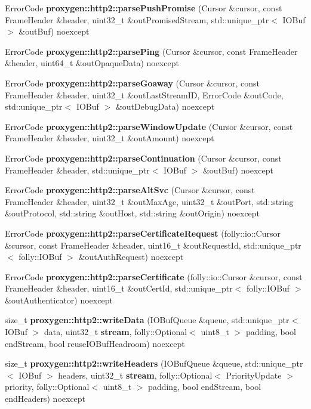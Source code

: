 \begin{DoxyCompactItemize}
\item 
Error\+Code {\bf proxygen\+::http2\+::parse\+Push\+Promise} (Cursor \&cursor, const Frame\+Header \&header, uint32\+\_\+t \&out\+Promised\+Stream, std\+::unique\+\_\+ptr$<$ I\+O\+Buf $>$ \&out\+Buf) noexcept
\item 
Error\+Code {\bf proxygen\+::http2\+::parse\+Ping} (Cursor \&cursor, const Frame\+Header \&header, uint64\+\_\+t \&out\+Opaque\+Data) noexcept
\item 
Error\+Code {\bf proxygen\+::http2\+::parse\+Goaway} (Cursor \&cursor, const Frame\+Header \&header, uint32\+\_\+t \&out\+Last\+Stream\+ID, Error\+Code \&out\+Code, std\+::unique\+\_\+ptr$<$ I\+O\+Buf $>$ \&out\+Debug\+Data) noexcept
\item 
Error\+Code {\bf proxygen\+::http2\+::parse\+Window\+Update} (Cursor \&cursor, const Frame\+Header \&header, uint32\+\_\+t \&out\+Amount) noexcept
\item 
Error\+Code {\bf proxygen\+::http2\+::parse\+Continuation} (Cursor \&cursor, const Frame\+Header \&header, std\+::unique\+\_\+ptr$<$ I\+O\+Buf $>$ \&out\+Buf) noexcept
\item 
Error\+Code {\bf proxygen\+::http2\+::parse\+Alt\+Svc} (Cursor \&cursor, const Frame\+Header \&header, uint32\+\_\+t \&out\+Max\+Age, uint32\+\_\+t \&out\+Port, std\+::string \&out\+Protocol, std\+::string \&out\+Host, std\+::string \&out\+Origin) noexcept
\item 
Error\+Code {\bf proxygen\+::http2\+::parse\+Certificate\+Request} (folly\+::io\+::\+Cursor \&cursor, const Frame\+Header \&header, uint16\+\_\+t \&out\+Request\+Id, std\+::unique\+\_\+ptr$<$ folly\+::\+I\+O\+Buf $>$ \&out\+Auth\+Request) noexcept
\item 
Error\+Code {\bf proxygen\+::http2\+::parse\+Certificate} (folly\+::io\+::\+Cursor \&cursor, const Frame\+Header \&header, uint16\+\_\+t \&out\+Cert\+Id, std\+::unique\+\_\+ptr$<$ folly\+::\+I\+O\+Buf $>$ \&out\+Authenticator) noexcept
\item 
size\+\_\+t {\bf proxygen\+::http2\+::write\+Data} (I\+O\+Buf\+Queue \&queue, std\+::unique\+\_\+ptr$<$ I\+O\+Buf $>$ data, uint32\+\_\+t {\bf stream}, folly\+::\+Optional$<$ uint8\+\_\+t $>$ padding, bool end\+Stream, bool reuse\+I\+O\+Buf\+Headroom) noexcept
\item 
size\+\_\+t {\bf proxygen\+::http2\+::write\+Headers} (I\+O\+Buf\+Queue \&queue, std\+::unique\+\_\+ptr$<$ I\+O\+Buf $>$ headers, uint32\+\_\+t {\bf stream}, folly\+::\+Optional$<$ Priority\+Update $>$ priority, folly\+::\+Optional$<$ uint8\+\_\+t $>$ padding, bool end\+Stream, bool end\+Headers) noexcept

\end{DoxyCompactItemize}
